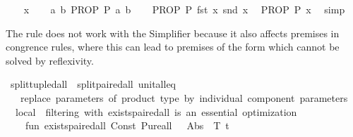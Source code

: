 \begin{isabellebody}
\isanewline
{}\isamarkupfalse%
\isanewline
\ \ \isamarkupfalse%
\ x\isanewline
\ \ \isamarkupfalse%
\ {\isachardoublequoteopen}{\isasymAnd}a\ b{\isachardot}{\kern0pt}\ PROP\ P\ {\isacharparenleft}{\kern0pt}a{\isacharcomma}{\kern0pt}\ b{\isacharparenright}{\kern0pt}{\isachardoublequoteclose}\isanewline
\ \ \isamarkupfalse%
\ {\isacartoucheopen}PROP\ P\ {\isacharparenleft}{\kern0pt}fst\ x{\isacharcomma}{\kern0pt}\ snd\ x{\isacharparenright}{\kern0pt}{\isacartoucheclose}\ \isamarkupfalse%
\ {\isachardoublequoteopen}PROP\ P\ x{\isachardoublequoteclose}\ \isamarkupfalse%
\ simp\isanewline
{}\isamarkupfalse%
%
\endisatagproof
{\isafoldproof}%
%
\isadelimproof
%
\endisadelimproof
%
\begin{isamarkuptext}%
The rule  does not work with the
  Simplifier because it also affects premises in congrence rules,
  where this can lead to premises of the form 
  which cannot be solved by reflexivity.%
\end{isamarkuptext}\isamarkuptrue%
\isamarkupfalse%
\ split{\isacharunderscore}{\kern0pt}tupled{\isacharunderscore}{\kern0pt}all\ {\isacharequal}{\kern0pt}\ split{\isacharunderscore}{\kern0pt}paired{\isacharunderscore}{\kern0pt}all\ unit{\isacharunderscore}{\kern0pt}all{\isacharunderscore}{\kern0pt}eq{}\isanewline
%
\isadelimML
\isanewline
%
\endisadelimML
%
\isatagML
{}\isamarkupfalse%
\ {\isacartoucheopen}\isanewline
\ \ {\isacharparenleft}{\kern0pt}{\isacharasterisk}{\kern0pt}\ replace\ parameters\ of\ product\ type\ by\ individual\ component\ parameters\ {\isacharasterisk}{\kern0pt}{\isacharparenright}{\kern0pt}\isanewline
\ \ local\ {\isacharparenleft}{\kern0pt}{\isacharasterisk}{\kern0pt}\ filtering\ with\ exists{\isacharunderscore}{\kern0pt}paired{\isacharunderscore}{\kern0pt}all\ is\ an\ essential\ optimization\ {\isacharasterisk}{\kern0pt}{\isacharparenright}{\kern0pt}\isanewline
\ \ \ \ fun\ exists{\isacharunderscore}{\kern0pt}paired{\isacharunderscore}{\kern0pt}all\ {\isacharparenleft}{\kern0pt}Const\ {\isacharparenleft}{\kern0pt}\isactrlconstUNDERSCOREname {\isasymopen}Pure{\isachardot}{\kern0pt}all{\isasymclose}{\isacharcomma}{\kern0pt}\ {\isacharunderscore}{\kern0pt}{\isacharparenright}{\kern0pt}\ {\isachardollar}{\kern0pt}\ Abs\ {\isacharparenleft}{\kern0pt}{\isacharunderscore}{\kern0pt}{\isacharcomma}{\kern0pt}\ T{\isacharcomma}{\kern0pt}\ t{\isacharparenright}{\kern0pt}{\isacharparenright}{\kern0pt}\ {\isacharequal}{\kern0pt}\isanewline

\end{isabellebody}
